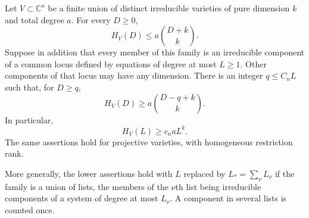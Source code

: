 \begin{lemma}\label{lem:poly-hilbert}
Let $V\subset\mathbb{C}^n$ be a finite union of distinct irreducible varieties of pure dimension $k$ and total degree $a$.  For every $D\ge0$,
\begin{equation}\label{eq:poly-hilbert-upper}
 H_V(D)\le a\binom{D+k}{k}.
\end{equation}
Suppose in addition that every member of this family is an irreducible component of a common locus defined by equations of degree at most $L\ge1$.  Other components of that locus may have any dimension.  There is an integer $q\le C_nL$ such that, for $D\ge q$,
\begin{equation}\label{eq:poly-hilbert-lower}
 H_V(D)\ge a\binom{D-q+k}{k}.
\end{equation}
In particular,
\begin{equation}\label{eq:poly-hilbert-at-L}
 H_V(L)\ge c_n aL^k.
\end{equation}
The same assertions hold for projective varieties, with homogeneous restriction rank.

More generally, the lower assertions hold with $L$ replaced by $L_* =\sum_\nu L_\nu$ if the family is a union of lists, the members of the $\nu$th list being irreducible components of a system of degree at most $L_\nu$.  A component in several lists is counted once.
\end{lemma}


